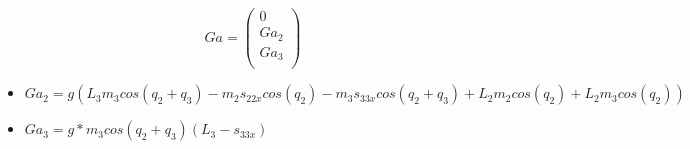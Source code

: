 	\[
	Ga=
	\begin{pmatrix}
	0\\
	Ga_{2}\\
	Ga_{3}\\
	\end{pmatrix} \] 
	
	\begin{itemize}
		\item 
		$Ga_{2}=g(L_{3}m_{3}cos(q_{2}+q_{3})-m_{2}s_{22x}cos(q_{2})-m_{3}s_{33x}cos(q_{2}+q_{3})+L_{2}m_{2}cos(q_{2})+L_{2}m_{3}cos(q_{2}))
		$
		
		\item 
		$Ga_{3}=g*m_{3}cos(q_{2}+q_{3})(L_{3}-s_{33x})
		$
	\end{itemize}


